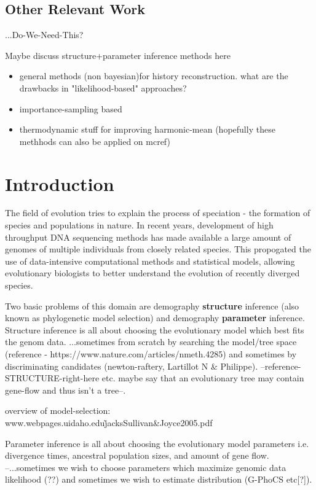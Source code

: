 \documentclass[11pt]{article}
\newcommand{\1}{\mathbbm{1}}
\begin{document}
\subsection{Other Relevant Work}

...Do-We-Need-This?

Maybe discuss structure+parameter inference methods here

\begin{itemize}
\item general methods (non bayesian)for history reconstruction. what are the drawbacks in "likelihood-based" approaches?

\item importance-sampling based

\item thermodynamic stuff for improving harmonic-mean (hopefully these methhods can also be applied on mcref)

\end{itemize}

\section{Introduction}


The field of evolution tries to explain the process of speciation - the formation of species and populations in nature. In recent years,  development of high throughput DNA sequencing methods has made available a large amount of genomes of multiple individuals from closely related species. This propogated the use of data-intensive computational methods and statistical models, allowing evolutionary biologists to better understand the evolution of recently diverged species.

Two basic problems of this domain are demography \textbf{structure} inference (also known as phylogenetic model selection) and demography \textbf{parameter} inference. 
Structure inference is all about choosing the evolutionary model which best fits the genom data. ...sometimes from scratch by searching the model/tree space (reference - https://www.nature.com/articles/nmeth.4285) and sometimes by discriminating candidates (newton-raftery, Lartillot N \& Philippe). --reference-STRUCTURE-right-here etc. maybe say that an evolutionary tree may contain gene-flow and thus isn't a tree--.

overview of model-selection: www.webpages.uidaho.edu\/\~jacks\/Sullivan\&Joyce2005.pdf


Parameter inference is all about choosing the evolutionary model parameters i.e. divergence times, ancestral population sizes, and amount of gene flow. --...sometimes we wish to choose parameters which maximize genomic data likelihood (??) and sometimes we wish to estimate distribution (G-PhoCS etc[?]). 
\end{document}
